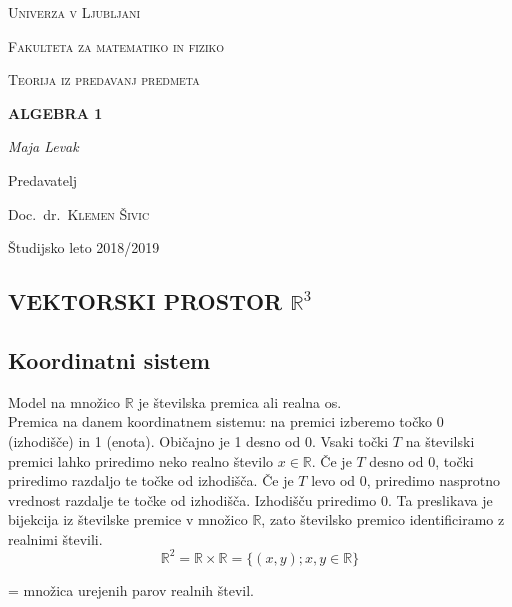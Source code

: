\documentclass[a4paper,12pt]{article}
\begin{document}
\begin{titlepage}
	\centering
	{\scshape\LARGE Univerza v Ljubljani \\}
	\vspace{10mm}
	{\scshape \normalsize Fakulteta za matematiko in fiziko\par}
	\vspace{40mm}
	{\scshape\large Teorija iz predavanj predmeta\par}
	\vspace{5mm}
	{\Huge\bfseries \textsc{ALGEBRA 1} \par}
	\vspace{30mm}
	{\large\itshape Maja Levak\par}
	\vfill
	Predavatelj\par
	Doc.~dr.~\textsc{Klemen Šivic}

	\vfill

	{\normalsize{Študijsko leto 2018/2019} \par}
\end{titlepage}


\newpage
\tableofcontents
\newpage

\begin{center}
\section{VEKTORSKI PROSTOR $\mathbb{R}^3$}
\subsection{Koordinatni sistem}
\end{center}

Model na množico $\mathbb{R}$ je številska premica ali realna os. \\

Premica na danem koordinatnem sistemu: na premici izberemo točko 0 (izhodišče) in 1 (enota). Običajno je 1 desno od 0. Vsaki točki $T$ na številski premici lahko priredimo neko realno število $x \in \mathbb{R} $. Če je $T$ desno od 0, točki priredimo razdaljo te točke od izhodišča. Če je $T$ levo od 0, priredimo nasprotno vrednost razdalje te točke od izhodišča. Izhodišču priredimo 0. Ta preslikava je bijekcija iz številske premice v množico $\mathbb{R}$, zato številsko premico identificiramo z realnimi števili. \\
$$  \mathbb{R}^2 =  \mathbb{R} \times \mathbb{R} = \{ (x,y) ; x, y \in \mathbb{R} \}$$  

\begin{center}
= množica urejenih parov realnih števil. \\
\end{center}
\end{document}
